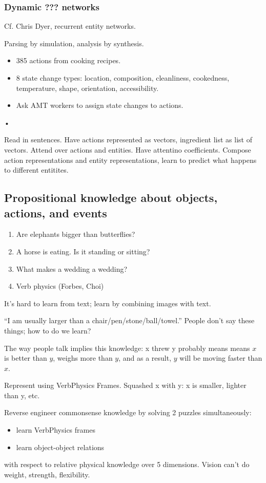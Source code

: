 \subsubsection{Dynamic ??? networks}

Cf. Chris Dyer, recurrent entity networks.

Parsing by simulation, analysis by synthesis.
\begin{itemize}
\item
385 actions from cooking recipes.
\item
8 state change types: location, composition, cleanliness, cookedness, temperature, shape, orientation, accessibility.
\item
Ask AMT workers to assign state changes to actions.
\end{itemize}•

Read in sentences. Have actions represented as vectors, ingredient list as list of vectors. Attend over actions and entities. Have attentino coefficients. Compose action representations and entity representations, learn to predict what happens to different entitites. 

\subsection{Propositional knowledge about objects, actions, and events}

\begin{enumerate}
\item
Are elephants bigger than butterflies?
\item
A horse is eating. Is it standing or sitting?
\item
What makes a wedding a wedding?
\item
Verb physics (Forbes, Choi)
\end{enumerate}
It's hard to learn from text; learn by combining images with text.

``I am usually larger than a chair/pen/stone/ball/towel.'' People don't say these things; how to do we learn?

The way people talk implies this knowledge: x threw y probably means means $x$ is better than $y$, weighs more than $y$, and as a result, $y$ will be moving faster than $x$.

Represent using VerbPhysics Frames. Squashed x with y: x is smaller, lighter than y, etc.

Reverse engineer commonsense knowledge by solving 2 puzzles simultaneously:
\begin{itemize}
\item
learn VerbPhysics frames
\item
learn object-object relations
\end{itemize}
with respect to relative physical knowledge over 5 dimensions. Vision can't do weight, strength, flexibility.

